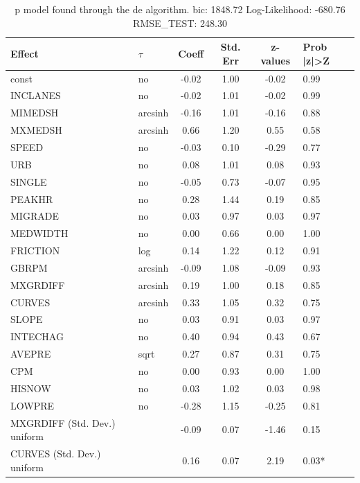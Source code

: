 \begin{table}
	\caption{p model found through the de algorithm. bic: 1848.72 Log-Likelihood: -680.76 RMSE_TEST: 248.30}
	\begin{center}
		\begin{tabular}{|l|l|c|c|c|l|}
			\hline
			Effect & $\tau$ & Coeff & Std. Err & z-values & Prob |z|>Z \\
			\hline
			const & no & -0.02 & 1.00 & -0.02 & 0.99 \\
			\hline
			INCLANES & no & -0.02 & 1.01 & -0.02 & 0.99 \\
			\hline
			MIMEDSH & arcsinh & -0.16 & 1.01 & -0.16 & 0.88 \\
			\hline
			MXMEDSH & arcsinh & 0.66 & 1.20 & 0.55 & 0.58 \\
			\hline
			SPEED & no & -0.03 & 0.10 & -0.29 & 0.77 \\
			\hline
			URB & no & 0.08 & 1.01 & 0.08 & 0.93 \\
			\hline
			SINGLE & no & -0.05 & 0.73 & -0.07 & 0.95 \\
			\hline
			PEAKHR & no & 0.28 & 1.44 & 0.19 & 0.85 \\
			\hline
			MIGRADE & no & 0.03 & 0.97 & 0.03 & 0.97 \\
			\hline
			MEDWIDTH & no & 0.00 & 0.66 & 0.00 & 1.00 \\
			\hline
			FRICTION & log & 0.14 & 1.22 & 0.12 & 0.91 \\
			\hline
			GBRPM & arcsinh & -0.09 & 1.08 & -0.09 & 0.93 \\
			\hline
			MXGRDIFF & arcsinh & 0.19 & 1.00 & 0.18 & 0.85 \\
			\hline
			CURVES & arcsinh & 0.33 & 1.05 & 0.32 & 0.75 \\
			\hline
			SLOPE & no & 0.03 & 0.91 & 0.03 & 0.97 \\
			\hline
			INTECHAG & no & 0.40 & 0.94 & 0.43 & 0.67 \\
			\hline
			AVEPRE & sqrt & 0.27 & 0.87 & 0.31 & 0.75 \\
			\hline
			CPM & no & 0.00 & 0.93 & 0.00 & 1.00 \\
			\hline
			HISNOW & no & 0.03 & 1.02 & 0.03 & 0.98 \\
			\hline
			LOWPRE & no & -0.28 & 1.15 & -0.25 & 0.81 \\
			\hline
			MXGRDIFF (Std. Dev.) uniform &  & -0.09 & 0.07 & -1.46 & 0.15 \\
			\hline
			CURVES (Std. Dev.) uniform &  & 0.16 & 0.07 & 2.19 & 0.03* \\

\end{tabular}
\end{center}
\end{table}
